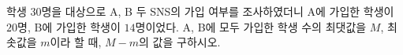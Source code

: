 학생 $30$명을 대상으로 A, B 두 SNS의 가입 여부를 조사하였더니 A에 가입한 학생이 $20$명, B에 가입한 학생이 $14$명이었다. A, B에 모두 가입한 학생 수의 최댓값을 $M$, 최솟값을 $m$이라 할 때, $M-m$의 값을 구하시오.
